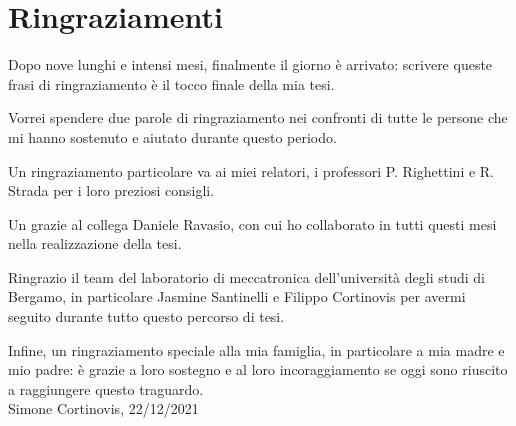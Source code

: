 \begin{flushright}
	
	\par   %
	\vspace{3\baselineskip}

	\par
	\vspace{3\baselineskip}
	
\end{flushright}
\vfill
\thispagestyle{empty}
\section*{Ringraziamenti}
Dopo nove lunghi e intensi mesi, finalmente il giorno è arrivato: scrivere queste frasi di ringraziamento è il tocco finale della mia tesi. 
\par Vorrei spendere due parole di ringraziamento nei confronti di tutte le persone che mi hanno sostenuto e aiutato durante questo periodo.
\par Un ringraziamento particolare va ai miei relatori, i professori P. Righettini e R. Strada per i loro preziosi consigli.
\par Un grazie al collega Daniele Ravasio, con cui ho collaborato in tutti questi mesi nella realizzazione della tesi.
\par Ringrazio il team del laboratorio di meccatronica dell'università degli studi di Bergamo, in particolare Jasmine Santinelli e Filippo Cortinovis per avermi seguito durante tutto questo percorso di tesi.
\par Infine, un ringraziamento speciale alla mia famiglia, in particolare a mia madre e mio padre: è grazie a loro sostegno e al loro incoraggiamento se oggi sono riuscito a raggiungere questo traguardo.
\\Simone Cortinovis, 22/12/2021